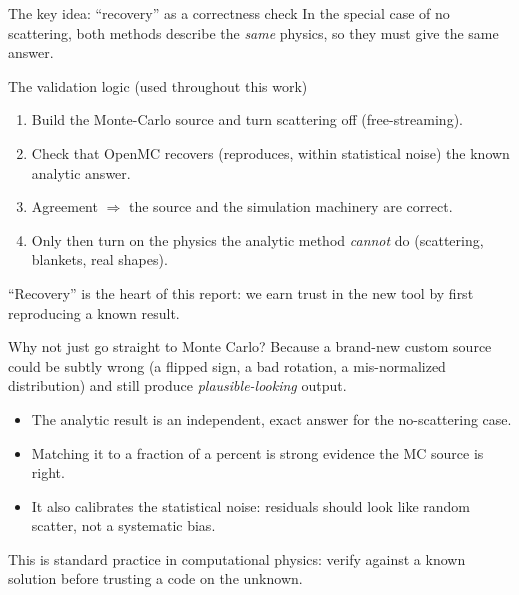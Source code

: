 \documentclass[aspectratio=169]{beamer}
\begin{document}
\begin{frame}{The key idea: ``recovery'' as a correctness check}
  In the special case of \alert{no scattering}, both methods describe the \emph{same} physics, so they must give the \alert{same answer}.
  \vfill
  \begin{block}{The validation logic (used throughout this work)}
    \begin{enumerate}
      \item Build the Monte-Carlo source and turn scattering \alert{off} (free-streaming).
      \item Check that OpenMC \alert{recovers} (reproduces, within statistical noise) the known analytic answer.
      \item Agreement $\Rightarrow$ the source and the simulation machinery are \alert{correct}.
      \item \alert{Only then} turn on the physics the analytic method \emph{cannot} do (scattering, blankets, real shapes).
    \end{enumerate}
  \end{block}
  \vfill
  \alert{``Recovery'' is the heart of this report:} we earn trust in the new tool by first reproducing a known result.
\end{frame}

\begin{frame}{Why not just go straight to Monte Carlo?}
  Because a brand-new custom source could be \alert{subtly wrong} (a flipped sign, a bad rotation, a mis-normalized distribution) and still produce \emph{plausible-looking} output.
  \vfill
  \begin{itemize}
    \item The analytic result is an \alert{independent, exact} answer for the no-scattering case.
    \item Matching it to a fraction of a percent is strong evidence the MC source is right.
    \item It also calibrates the \alert{statistical noise}: residuals should look like random scatter, not a systematic bias.
  \end{itemize}
  \vfill
  \footnotesize This is standard practice in computational physics: \alert{verify against a known solution} before trusting a code on the unknown.
\end{frame}

\end{document}
